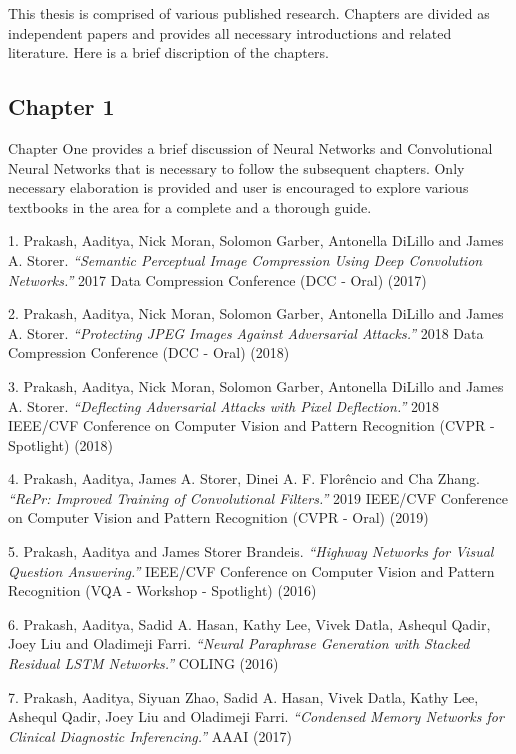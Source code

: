 This thesis is comprised of various published research. Chapters are divided as independent papers and provides all necessary introductions and related literature. Here is a brief discription of the chapters.

\subsection{Chapter 1}
Chapter One provides a brief discussion of Neural Networks and Convolutional Neural Networks that is necessary to follow the subsequent chapters. Only necessary elaboration is provided and user is encouraged to explore various textbooks in the area for a complete and a thorough guide.

\vspace{2em}

1. Prakash, Aaditya, Nick Moran, Solomon Garber, Antonella DiLillo and James A. Storer. \textit{``Semantic Perceptual Image Compression Using Deep Convolution Networks.''} 2017 Data Compression Conference (DCC - Oral) (2017)
\vspace{2em}

2. Prakash, Aaditya, Nick Moran, Solomon Garber, Antonella DiLillo and James A. Storer. \textit{``Protecting JPEG Images Against Adversarial Attacks.''} 2018 Data Compression Conference (DCC - Oral) (2018)
\vspace{2em}

3. Prakash, Aaditya, Nick Moran, Solomon Garber, Antonella DiLillo and James A. Storer. \textit{``Deflecting Adversarial Attacks with Pixel Deflection.''} 2018 IEEE/CVF Conference on Computer Vision and Pattern Recognition (CVPR - Spotlight) (2018)
\vspace{2em}

4. Prakash, Aaditya, James A. Storer, Dinei A. F. Florêncio and Cha Zhang. \textit{``RePr: Improved Training of Convolutional Filters.''} 2019 IEEE/CVF Conference on Computer Vision and Pattern Recognition (CVPR - Oral) (2019)
\vspace{2em}

5. Prakash, Aaditya and James Storer Brandeis. \textit{``Highway Networks for Visual Question Answering.''} IEEE/CVF Conference on Computer Vision and Pattern Recognition (VQA - Workshop - Spotlight) (2016)
\vspace{2em}

6. Prakash, Aaditya, Sadid A. Hasan, Kathy Lee, Vivek Datla, Ashequl Qadir, Joey Liu and Oladimeji Farri. \textit{``Neural Paraphrase Generation with Stacked Residual LSTM Networks.''} COLING (2016) 
\vspace{2em}

7. Prakash, Aaditya, Siyuan Zhao, Sadid A. Hasan, Vivek Datla, Kathy Lee, Ashequl Qadir, Joey Liu and Oladimeji Farri. \textit{``Condensed Memory Networks for Clinical Diagnostic Inferencing.''} AAAI (2017)
\vspace{2em}
